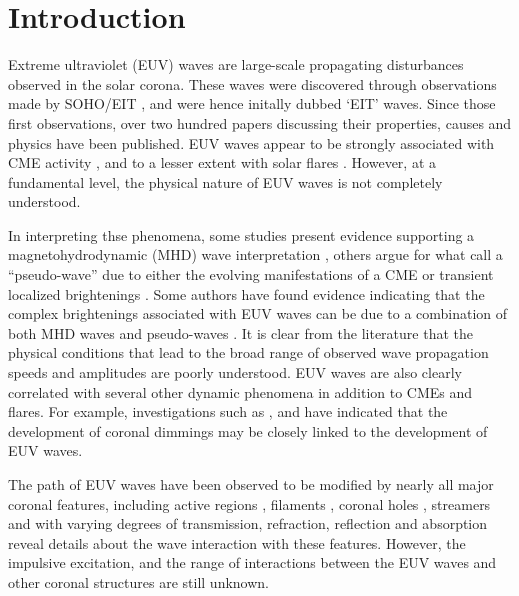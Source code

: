 \section{Introduction}\label{sec:Intro}

Extreme ultraviolet (EUV) waves are large-scale propagating
disturbances observed in the solar corona. These waves were discovered
through observations made by SOHO/EIT \citep{1997SoPh..175..571M,
  1998GeoRL..25.2465T, 1999ApJ...517L.151T}, and were hence initally
dubbed `EIT' waves. Since those first observations, over two hundred
papers discussing their properties, causes and physics have been
published. EUV waves appear to be strongly associated with CME
activity \cite{2002ApJ...569.1009B}, and to a lesser extent with solar
flares \citep{2006ApJ...641L.153}. However, at a fundamental level, the
physical nature of EUV waves is not completely understood.

In interpreting thse phenomena, some studies present evidence
supporting a magnetohydrodynamic (MHD) wave interpretation
\citep{1998GeoRL..25.2465T, 1999ApJ...517L.151T,2000ApJ...543L..89W,
  2001JGR...10625089W, 2002ApJ...574..440O, 2010ApJ...713.1008S},
others argue for what \cite{2012SoPh..281..187P} call a “pseudo-wave”
due to either the evolving manifestations of a CME
\citep{1999SoPh..190..107D, 2000ApJ...545..512D, 2008SoPh..247..123D,
  2011ApJ...738..167S} or transient localized brightenings
\citep{2007ApJ...656L.101A, 2007AN....328..760A}.  Some authors have
found evidence indicating that the complex brightenings associated
with EUV waves can be due to a combination of both MHD waves and
pseudo-waves \citep{2002ApJ...572L..99C, 2005ApJ...622.1202C,
  2004A&A...427..705Z, 2009ApJ...705..587C}.  It is clear from the
literature that the physical conditions that lead to the broad range
of observed wave propagation speeds \citep{2011A&A...532A.151W} and
amplitudes are poorly understood. EUV waves are also clearly
correlated with several other dynamic phenomena in addition to CMEs
and flares. For example, investigations such as
\cite{2000SoPh..193..161T}, \cite{2004A&A...427..705Z} and
\cite{2010ApJ...709..369P} have indicated that the development of
coronal dimmings may be closely linked to the development of EUV
waves.

The path of EUV waves have been observed to be modified by nearly all
major coronal features, including active regions
\citep{2000ApJ...543L..89W}, filaments \citep{2012ApJ...753...52L},
coronal holes \citep{2009ApJ...691L.123G}, streamers
\citep{2013ApJ...766...55K} and with varying degrees of transmission,
refraction, reflection and absorption reveal details about the wave
interaction with these features. However, the impulsive excitation,
and the range of interactions between the EUV waves and other coronal
structures are still unknown.

